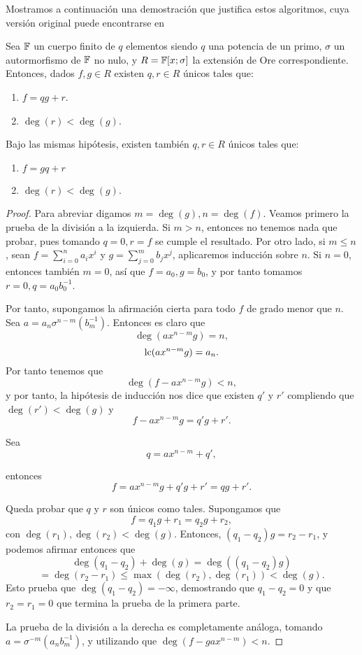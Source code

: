 Mostramos a continuación una demostración que justifica estos algoritmos, cuya versión original puede encontrarse en~\cite[Th. 4.34]{bueso2003algorithmic}

\begin{theorem}
Sea \(\mathbb{F}\) un cuerpo finito de \(q\) elementos siendo \(q\) una potencia de un primo,  \(\sigma\) un autormorfismo de \(\mathbb{F}\) no nulo, y \(R = \mathbb{F}[x;\sigma]\) la extensión de Ore correspondiente. Entonces, dados \(f, g \in R\) existen \(q, r \in R\) únicos tales que:
\begin{enumerate}
    \item \(f = qg + r\).
    \item \(\deg(r) < \deg(g)\).
\end{enumerate}

Bajo las mismas hipótesis, existen también \(q, r \in R\) únicos tales que:
\begin{enumerate}
    \item \(f = gq + r\)
    \item \(\deg(r) < \deg(g)\).
\end{enumerate}
\end{theorem}

\begin{proof}
Para abreviar digamos \(m = \deg(g), n = \deg(f)\). Veamos primero la prueba de la división a la izquierda. Si \(m > n\), entonces no tenemos nada que probar, pues tomando  \(q = 0, r = f\) se cumple el resultado. Por otro lado, si \(m \leq n\), sean \(f = \sum_{i=0}^{n} a_i x^i\) y \(g = \sum_{j=0}^{m} b_j x^j\), aplicaremos inducción sobre \(n\). Si \(n = 0\), entonces también \(m = 0\), así que  \(f = a_0, g = b_0\), y por tanto tomamos \(r = 0, q = a_0 b_0^{-1}\).

Por tanto, supongamos la afirmación cierta para todo \(f\) de grado menor que \(n\).  Sea \(a = a_n \sigma^{n-m}(b_m^{-1})\). Entonces es claro que
\[
\deg(ax^{n-m}g) = n,
\]
\[
\operatorname{lc}(ax^{n-m}g) = a_n
.\]
Por tanto tenemos que
\[
\deg(f - a x^{n-m}g) < n,
\]
y por tanto, la hipótesis de inducción nos dice que existen \(q'\) y \(r'\) compliendo que \(\deg(r') < \deg(g)\)  y
\[
f - a x^{n-m}g = q'g + r'
.\]

Sea
\[
q = a x^{n-m} + q'
,\]

entonces
\[
f = a x^{n-m}g + q'g + r' = qg + r'
.\]

Queda probar que \(q\) y \(r\) son únicos como tales. Supongamos que
\[
f = q_1g + r_1 = q_2g + r_2,
\]
con \(\deg(r_1), \deg(r_2) < \deg(g)\). Entonces, \((q_1 - q_2)g = r_2 - r_1\), y podemos afirmar entonces que
\[
\deg(q_1 - q_2) + \deg(g) = \deg((q_1-q_2)g)
\]
\[
= \deg(r_2-r_1) \leq \max(\deg(r_2), \deg(r_1)) < \deg(g)
.\]
Esto prueba que \(\deg(q_1-q_2) = -\infty\), demostrando que \(q_1 - q_2 = 0\) y que \(r_2 = r_1 = 0\) que termina la prueba de la primera parte.

La prueba de la división a la derecha es completamente análoga, tomando \(a = \sigma^{-m}(a_{n}b_{m}^{-1})\), y utilizando que \(\deg(f - gax^{n-m}) < n\).

\end{proof}

